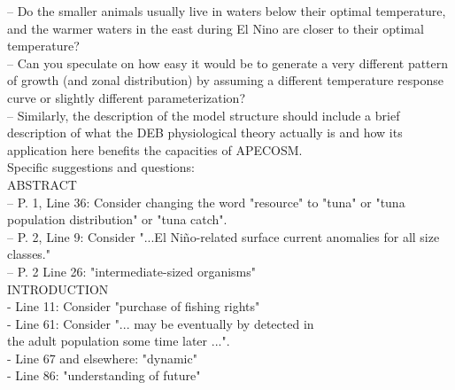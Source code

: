 \documentclass{article}
\begin{document}

-- Do the smaller animals usually live in waters below their optimal temperature, and the warmer waters in the east during El Nino are closer to their optimal temperature?\\


-- Can you speculate on how easy it would be to generate a very different pattern of growth (and zonal distribution) by assuming a different temperature response curve or slightly different parameterization?\\


-- Similarly, the description of the model structure should include a brief description of what the DEB physiological theory actually is and how its application here benefits the capacities of APECOSM.\\


Specific suggestions and questions:\\

ABSTRACT\\

-- P. 1, Line 36: Consider changing the word "resource" to "tuna" or "tuna population distribution" or "tuna catch".\\

-- P. 2, Line 9: Consider "...El Niño-related surface current anomalies for all size classes."\\

-- P. 2 Line 26: "intermediate-sized organisms"\\

INTRODUCTION\\

- Line 11: Consider "purchase of fishing rights"\\

- Line 61: Consider "... may be eventually by detected in\\ the adult population some time later ...".\\

- Line 67 and elsewhere: "dynamic"\\

- Line 86: "understanding of future" \\
\end{document}

